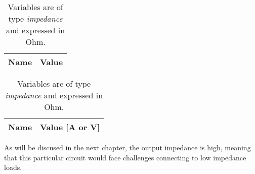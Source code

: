 \begin{table}[h]
\centering
\begin{minipage}[t]{0.50\linewidth}
 	 \begin{tabular}[t]{|l|r|}
    	\hline    
   		{\bf Name} & {\bf Value} \\ \hline
    	
  	\end{tabular}
  	\caption{ Variables are of type {\it impedance} and expressed in Ohm.}
  	\label{tab:SIM_ZIN}
\end{minipage}

\begin{minipage}[t]{0.50\linewidth}
  	\begin{tabular}[t]{|l|r|}
    	\hline    
   		{\bf Name} & {\bf Value [A or V]} \\ \hline
    	
  	\end{tabular}
	\caption{ Variables are of type {\it impedance} and expressed in Ohm.}
  	\label{tab:SIM_ZOUT}
\end{minipage}
\end{table}

As will be discused in the next chapter, the output impedance is high, meaning that this particular circuit would face challenges connecting to low impedance loads.